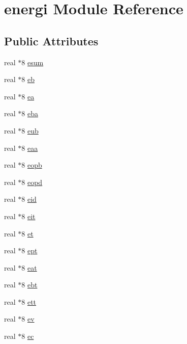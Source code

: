 \hypertarget{classenergi}{\section{energi Module Reference}
\label{classenergi}
}
\subsection*{Public Attributes}
\begin{DoxyCompactItemize}
\item 
real $\ast$8 \hyperlink{classenergi_aa8b52e0fd2c978dbcdfcea144ea4bdc5}{esum}
\item 
real $\ast$8 \hyperlink{classenergi_a806d652013240b5d7e3508ff1a8fd390}{eb}
\item 
real $\ast$8 \hyperlink{classenergi_add88b8513281bf7e45c046e37b0e2a0a}{ea}
\item 
real $\ast$8 \hyperlink{classenergi_a979ef244a80e5198e4de11ff0eef8cf5}{eba}
\item 
real $\ast$8 \hyperlink{classenergi_a59f417d8fe59330a0353ef451c767083}{eub}
\item 
real $\ast$8 \hyperlink{classenergi_ac2cd1c7e7a5183a9e74e04b7fd7afd6b}{eaa}
\item 
real $\ast$8 \hyperlink{classenergi_ad21d857824fcf48e4bb6e2e75eecbf07}{eopb}
\item 
real $\ast$8 \hyperlink{classenergi_a11375c6c5245048a2be654192e8ad678}{eopd}
\item 
real $\ast$8 \hyperlink{classenergi_a1a27b071ba10506e864bf6ffd548a3ee}{eid}
\item 
real $\ast$8 \hyperlink{classenergi_a2472305c8df1e292032c51061c895cea}{eit}
\item 
real $\ast$8 \hyperlink{classenergi_a04950f69c0e2a524732bfd127da6de72}{et}
\item 
real $\ast$8 \hyperlink{classenergi_ab56489e1e3639b219efef8f1004b0eab}{ept}
\item 
real $\ast$8 \hyperlink{classenergi_aae8c9f779528371d924cdf39e40e10ea}{eat}
\item 
real $\ast$8 \hyperlink{classenergi_a2625f637eb404a55f1db3bf7f907b207}{ebt}
\item 
real $\ast$8 \hyperlink{classenergi_aa4f0c395f8f434e1d69ea3a3e97ae114}{ett}
\item 
real $\ast$8 \hyperlink{classenergi_a8e4ba73bb3434084b185cb0190e3f212}{ev}
\item 
real $\ast$8 \hyperlink{classenergi_ae3187fa3ef9fe159f375837345cd3110}{ec}

\end{DoxyCompactItemize}
